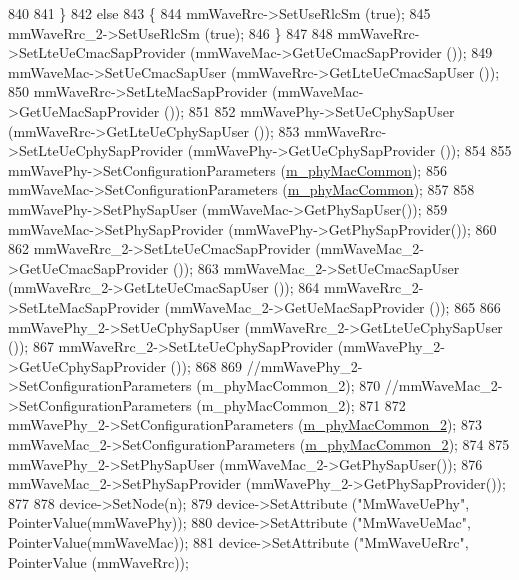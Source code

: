 \begin{DoxyCode}
840 
841         \}
842         \textcolor{keywordflow}{else}
843         \{
844                 mmWaveRrc->SetUseRlcSm (\textcolor{keyword}{true});
845                 mmWaveRrc\_2->SetUseRlcSm (\textcolor{keyword}{true});
846         \}
847 
848         mmWaveRrc->SetLteUeCmacSapProvider (mmWaveMac->GetUeCmacSapProvider ());
849         mmWaveMac->SetUeCmacSapUser (mmWaveRrc->GetLteUeCmacSapUser ());
850         mmWaveRrc->SetLteMacSapProvider (mmWaveMac->GetUeMacSapProvider ());
851 
852         mmWavePhy->SetUeCphySapUser (mmWaveRrc->GetLteUeCphySapUser ());
853         mmWaveRrc->SetLteUeCphySapProvider (mmWavePhy->GetUeCphySapProvider ());
854 
855         mmWavePhy->SetConfigurationParameters (\hyperlink{classns3_1_1MmWaveHelper_a6aaa35de743b9a88998de0128b1046b4}{m\_phyMacCommon});
856         mmWaveMac->SetConfigurationParameters (\hyperlink{classns3_1_1MmWaveHelper_a6aaa35de743b9a88998de0128b1046b4}{m\_phyMacCommon});
857 
858         mmWavePhy->SetPhySapUser (mmWaveMac->GetPhySapUser());
859         mmWaveMac->SetPhySapProvider (mmWavePhy->GetPhySapProvider());
860 
862         mmWaveRrc\_2->SetLteUeCmacSapProvider (mmWaveMac\_2->GetUeCmacSapProvider ());
863                 mmWaveMac\_2->SetUeCmacSapUser (mmWaveRrc\_2->GetLteUeCmacSapUser ());
864                 mmWaveRrc\_2->SetLteMacSapProvider (mmWaveMac\_2->GetUeMacSapProvider ());
865 
866                 mmWavePhy\_2->SetUeCphySapUser (mmWaveRrc\_2->GetLteUeCphySapUser ());
867                 mmWaveRrc\_2->SetLteUeCphySapProvider (mmWavePhy\_2->GetUeCphySapProvider ());
868 
869                 \textcolor{comment}{//mmWavePhy\_2->SetConfigurationParameters (m\_phyMacCommon\_2);}
870                 \textcolor{comment}{//mmWaveMac\_2->SetConfigurationParameters (m\_phyMacCommon\_2);}
871 
872                 mmWavePhy\_2->SetConfigurationParameters (\hyperlink{classns3_1_1MmWaveHelper_ab4e9d2f9a49a485dadb3404e8c196f4c}{m\_phyMacCommon\_2});
873                 mmWaveMac\_2->SetConfigurationParameters (\hyperlink{classns3_1_1MmWaveHelper_ab4e9d2f9a49a485dadb3404e8c196f4c}{m\_phyMacCommon\_2});
874 
875                 mmWavePhy\_2->SetPhySapUser (mmWaveMac\_2->GetPhySapUser());
876                 mmWaveMac\_2->SetPhySapProvider (mmWavePhy\_2->GetPhySapProvider());
877 
878         device->SetNode(n);
879         device->SetAttribute (\textcolor{stringliteral}{"MmWaveUePhy"}, PointerValue(mmWavePhy));
880         device->SetAttribute (\textcolor{stringliteral}{"MmWaveUeMac"}, PointerValue(mmWaveMac));
881         device->SetAttribute (\textcolor{stringliteral}{"MmWaveUeRrc"}, PointerValue (mmWaveRrc));

\end{DoxyCode}
